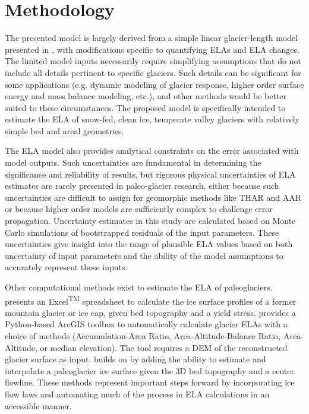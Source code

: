 \documentclass[review]{elsarticle}
\begin{document}
\section{Methodology}\label{sec:methods}

The presented model is largely derived from a simple linear glacier-length model presented in \cite{oerlemans_minimal_2008}, with modifications specific to quantifying ELAs and ELA changes.
The limited model inputs necessarily require simplifying assumptions that do not include all details pertinent to specific glaciers.
Such details can be significant for some applications (e.g. dynamic modeling of glacier response, higher order surface energy and mass balance modeling, etc.), and other methods would be better suited to these circumstances.
The proposed model is specifically intended to estimate the ELA of snow-fed, clean ice, temperate valley glaciers with relatively simple bed and areal geometries.

The ELA model also provides analytical constraints on the error associated with model outputs.
Such uncertainties are fundamental in determining the significance and reliability of results, but rigorous physical uncertainties of ELA estimates are rarely presented in paleo-glacier research, either because such uncertainties are difficult to assign for geomorphic methods like THAR and AAR or because higher order models are sufficiently complex to challenge error propagation.
Uncertainty estimates in this study are calculated based on Monte Carlo simulations of bootstrapped residuals of the input parameters.
These uncertainties give insight into the range of plausible ELA values based on both uncertainty of input parameters and the ability of the model assumptions to accurately represent those inputs.

Other computational methods exist to estimate the ELA of paleoglaciers.
\cite{benn_exceltm_2010} presents an Excel\textsuperscript{TM} spreadsheet to calculate the ice surface profiles of a former mountain glacier or ice cap, given bed topography and a yield stress.
\cite{pellitero_gis_2015} provides a Python-based ArcGIS toolbox to automatically calculate glacier ELAs with a choice of methods (Accumulation-Area Ratio, Area-Altitude-Balance Ratio, Area-Altitude, or median elevation).
The tool requires a DEM of the reconstructed glacier surface as input.
\cite{pellitero_glare_2016} builds on \cite{pellitero_gis_2015} by adding the ability to estimate and interpolate a paleoglacier ice surface given the 3D bed topography and a center flowline.
These methods represent important steps forward by incorporating ice flow laws and automating much of the process in ELA calculations in an accessible manner.
\end{document}
